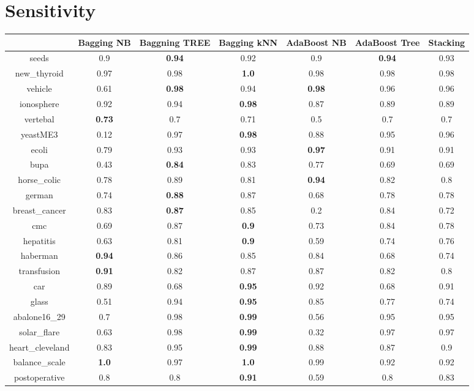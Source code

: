 \documentclass{article}%
\begin{document}
\section*{Sensitivity}%
\begin{tabular}{c|cccccc}%
&Bagging NB&Baggning TREE&Bagging kNN&AdaBoost NB&AdaBoost Tree&Stacking\\%
\hline%
seeds&0.9&\textbf{0.94}&0.92&0.9&\textbf{0.94}&0.93\\%
new\_thyroid&0.97&0.98&\textbf{1.0}&0.98&0.98&0.98\\%
vehicle&0.61&\textbf{0.98}&0.94&\textbf{0.98}&0.96&0.96\\%
ionosphere&0.92&0.94&\textbf{0.98}&0.87&0.89&0.89\\%
vertebal&\textbf{0.73}&0.7&0.71&0.5&0.7&0.7\\%
yeastME3&0.12&0.97&\textbf{0.98}&0.88&0.95&0.96\\%
ecoli&0.79&0.93&0.93&\textbf{0.97}&0.91&0.91\\%
bupa&0.43&\textbf{0.84}&0.83&0.77&0.69&0.69\\%
horse\_colic&0.78&0.89&0.81&\textbf{0.94}&0.82&0.8\\%
german&0.74&\textbf{0.88}&0.87&0.68&0.78&0.78\\%
breast\_cancer&0.83&\textbf{0.87}&0.85&0.2&0.84&0.72\\%
cmc&0.69&0.87&\textbf{0.9}&0.73&0.84&0.78\\%
hepatitis&0.63&0.81&\textbf{0.9}&0.59&0.74&0.76\\%
haberman&\textbf{0.94}&0.86&0.85&0.84&0.68&0.74\\%
transfusion&\textbf{0.91}&0.82&0.87&0.87&0.82&0.8\\%
car&0.89&0.68&\textbf{0.95}&0.92&0.68&0.91\\%
glass&0.51&0.94&\textbf{0.95}&0.85&0.77&0.74\\%
abalone16\_29&0.7&0.98&\textbf{0.99}&0.56&0.95&0.95\\%
solar\_flare&0.63&0.98&\textbf{0.99}&0.32&0.97&0.97\\%
heart\_cleveland&0.83&0.95&\textbf{0.99}&0.88&0.87&0.9\\%
balance\_scale&\textbf{1.0}&0.97&\textbf{1.0}&0.99&0.92&0.92\\%
postoperative&0.8&0.8&\textbf{0.91}&0.59&0.8&0.83\\%
\end{tabular}

%
\end{document}

